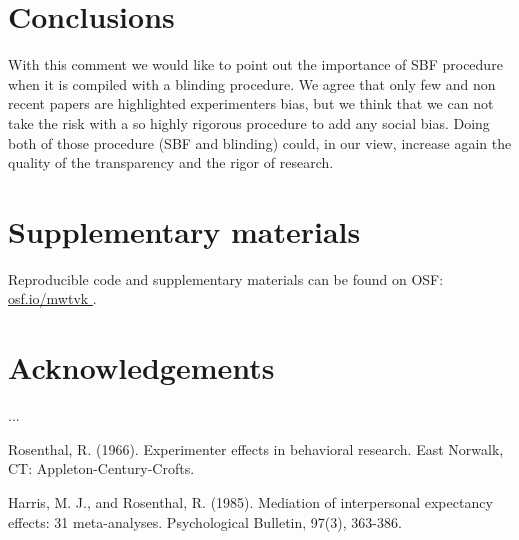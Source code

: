 \documentclass[a4paper,man,natbib,floatsintext,donotrepeattitle]{apa6}
\begin{document}

\section{Conclusions}

With this comment we would like to point out the importance of SBF procedure when it is compiled with a blinding procedure. We agree that only few and non recent papers are highlighted experimenters bias, but we think that we can not take the risk with a so highly rigorous procedure to add any social bias. Doing both of those procedure (SBF and blinding) could, in our view, increase again the quality of the transparency and the rigor of research. 


\section{Supplementary materials}\label{sec:supp}

Reproducible code and supplementary materials can be found on OSF: \url{osf.io/mwtvk
}.

\section{Acknowledgements}

...



Rosenthal, R. (1966). Experimenter effects in behavioral research. East Norwalk, CT: Appleton-Century-Crofts.

Harris, M. J., and Rosenthal, R. (1985). Mediation of interpersonal expectancy
effects: 31 meta-analyses. Psychological Bulletin, 97(3), 363-386.

\end{document}
